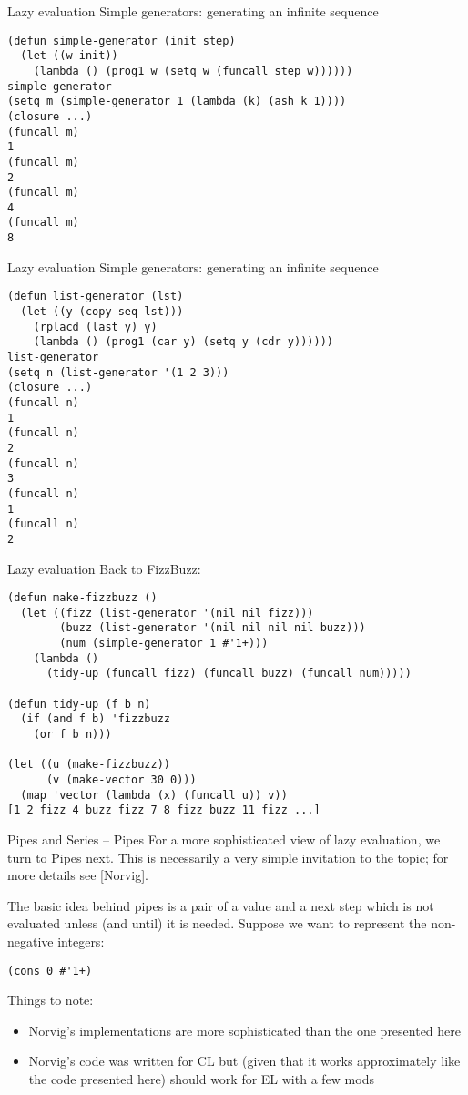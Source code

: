\documentclass[presentation]{beamer}
\begin{document}
\begin{frame}[fragile]{Lazy evaluation}
Simple generators: generating an infinite sequence
\begin{verbatim}
(defun simple-generator (init step)
  (let ((w init))
    (lambda () (prog1 w (setq w (funcall step w))))))
simple-generator
(setq m (simple-generator 1 (lambda (k) (ash k 1))))
(closure ...)
(funcall m)
1
(funcall m)
2
(funcall m)
4
(funcall m)
8
\end{verbatim}
\end{frame}

\begin{frame}[fragile]{Lazy evaluation}
Simple generators: generating an infinite sequence
\begin{verbatim}
(defun list-generator (lst)
  (let ((y (copy-seq lst)))
    (rplacd (last y) y)
    (lambda () (prog1 (car y) (setq y (cdr y))))))
list-generator
(setq n (list-generator '(1 2 3)))
(closure ...)
(funcall n)
1
(funcall n)
2
(funcall n)
3
(funcall n)
1
(funcall n)
2
\end{verbatim}
\end{frame}

\begin{frame}[fragile]{Lazy evaluation}
  Back to FizzBuzz:
\begin{verbatim}
(defun make-fizzbuzz ()
  (let ((fizz (list-generator '(nil nil fizz)))
        (buzz (list-generator '(nil nil nil nil buzz)))
        (num (simple-generator 1 #'1+)))
    (lambda ()
      (tidy-up (funcall fizz) (funcall buzz) (funcall num)))))

(defun tidy-up (f b n)
  (if (and f b) 'fizzbuzz
    (or f b n)))

(let ((u (make-fizzbuzz))
      (v (make-vector 30 0)))
  (map 'vector (lambda (x) (funcall u)) v))
[1 2 fizz 4 buzz fizz 7 8 fizz buzz 11 fizz ...]
\end{verbatim}
\end{frame}

\begin{frame}[fragile]{Pipes and Series -- Pipes}
  For a more sophisticated view of lazy evaluation, we turn to Pipes next.  This is necessarily a very simple invitation to the topic; for more details see [Norvig].

  \medskip
  The basic idea behind pipes is a pair of a value and a next step which is not evaluated unless (and until) it is needed.  Suppose we want to represent the non-negative integers:
\begin{verbatim}
(cons 0 #'1+)
\end{verbatim}
Things to note:
\begin{itemize}
\item Norvig's implementations are more sophisticated than the one presented here
\item Norvig's code was written for CL but (given that it works approximately like the code presented here) should work for EL with a few mods
\end{itemize}
\end{frame}
\end{document}
